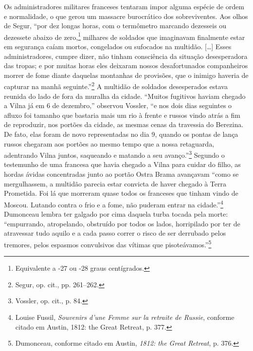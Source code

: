 Os administradores militares franceses tentaram impor alguma espécie de
ordem e normalidade, o que gerou um massacre burocrático dos
sobreviventes. Aos olhos de Segur, ``por dez longas horas, com o
termômetro marcando dezesseis ou dezessete abaixo de zero,\footnote{Equivalente a -27 ou -28
graus centígrados.} milhares de soldados que imaginavam finalmente
estar em segurança caíam mortos, congelados ou sufocados na multidão.
[\ldots{}] Esses administradores, cumpre dizer, não tinham consciência da
situação desesperadora das tropas; e por muitas horas eles deixaram
nossos desafortunados companheiros morrer de fome diante daquelas
montanhas de provisões, que o inimigo haveria de capturar na manhã
seguinte.''\footnote{Segur, op. cit., pp. 261--262.} A multidão de
soldados desesperados estava reunida do lado de fora da muralha da
cidade. ``Muitos fugitivos haviam chegado a Vilna já em 6 de dezembro,''
observou Vossler, ``e nos dois dias seguintes o afluxo foi tamanho que
bastaria mais um rio à frente e russos vindo atrás a fim de reproduzir,
nos portões da cidade, as mesmas cenas da travessia do Berezina. De
fato, elas foram de novo representadas no dia 9, quando os pontas de
lança russos chegaram aos portões ao mesmo tempo que a nossa retaguarda,
adentrando Vilna juntos, saqueando e matando a seu avanço.''\footnote{Vossler, op. cit., p. 84.} Segundo o testemunho de uma francesa que havia chegado a Vilna para cuidar do filho, as hordas ávidas concentradas
junto ao portão Ostra Brama avançavam ``como se mergulhassem, a multidão
parecia estar convicta de haver chegado à Terra Prometida. Foi lá que
morreram quase todos os franceses que tinham vindo de Moscou. Lutando
contra o frio e a fome, não puderam entrar na cidade.''\footnote{Louise Fussil, \textit{Souvenirs d'une Femme sur la retraite de Russie}, conforme citado em Austin, 1812: the Great Retreat, p. 377.} Dumonceau lembra ter galgado por cima daquela turba tocada pela morte:
``empurrando, atropelando, obstruído por todos os lados, horripilado por
ter de atravessar tudo aquilo e a cada passo correr o risco de ser
derrubado pelos tremores, pelos espasmos convulsivos das vítimas que
pisoteávamos.''\footnote{Dumonceau, conforme citado em Austin, \textit{1812: the Great Retreat}, p. 376.}

